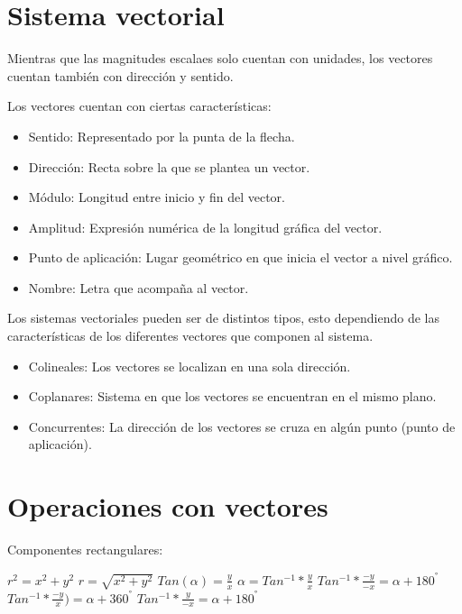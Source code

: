\section{Sistema vectorial}


Mientras que las magnitudes escalaes solo cuentan con unidades, los vectores cuentan también con dirección y sentido.

Los vectores cuentan con ciertas características:

\begin{itemize}
    \item Sentido: Representado por la punta de la flecha.
    \item Dirección: Recta sobre la que se plantea un vector.
    \item Módulo: Longitud entre inicio y fin del vector.
    \item Amplitud: Expresión numérica de la longitud gráfica del vector.
    \item Punto de aplicación: Lugar geométrico en que inicia el vector a nivel gráfico.
    \item Nombre: Letra que acompaña al vector.
\end{itemize}


Los sistemas vectoriales pueden ser de distintos tipos, esto dependiendo de las características de los diferentes vectores que componen al sistema.

\begin{itemize}
    \item Colineales: Los vectores se localizan en una sola dirección.
    \item Coplanares: Sistema en que los vectores se encuentran en el mismo plano.
    \item Concurrentes: La dirección de los vectores se cruza en algún punto (punto de aplicación).
\end{itemize}

\section{Operaciones con vectores}

Componentes rectangulares:

$r^2=x^2+y^2$
$r=\sqrt{x^2+y^2}$
$Tan(α)=\frac{y}{x}$
$α=Tan^{-1}*\frac{y}{x}$
$Tan^{-1}*\frac{-y}{-x}=α+180^°$
$Tan^{-1}*\frac{-y}{x})=α+360^°$
$Tan^{-1}*\frac{y}{-x}=α+180^°$
